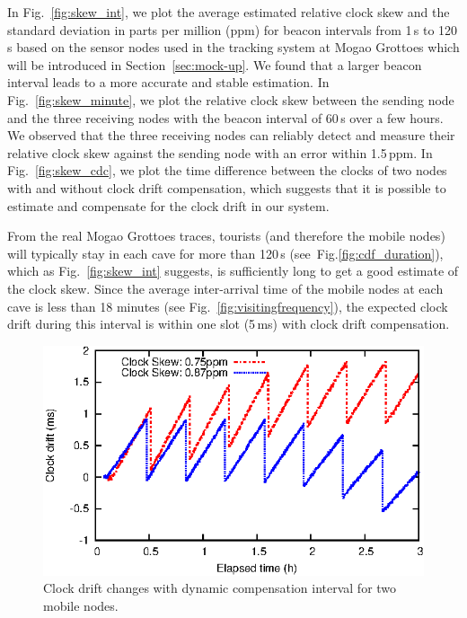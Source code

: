 \documentclass[twoside,twocolumn]{article}
\begin{document}
In Fig.~\ref{fig:skew_int}, we plot the average estimated relative
clock skew and the standard deviation in parts per million (ppm) for
beacon intervals from 1\,s to 120\,s based on the sensor nodes used
in the tracking system at Mogao Grottoes which will be introduced in 
Section~\ref{sec:mock-up}. We found that a larger beacon
interval leads to a more accurate and stable estimation.  In
Fig.~\ref{fig:skew_minute}, we plot the relative clock skew between
the sending node and the three receiving nodes with the beacon
interval of 60\,s over a few hours.  We observed that the three
receiving nodes can reliably detect and measure their relative clock
skew against the sending node with an error within 1.5\,ppm. In
Fig.~\ref{fig:skew_cdc}, we plot the time difference between the
clocks of two nodes with and without clock drift compensation, which
suggests that it is possible to estimate and compensate for the clock
drift in our system.

From the real Mogao Grottoes traces, tourists (and therefore the mobile
nodes) will typically stay in each cave for more than 120\,s
(see~Fig.\ref{fig:cdf_duration}), which as Fig.~\ref{fig:skew_int}
suggests, is sufficiently long to get a good estimate of the clock
skew. Since the average inter-arrival time of the mobile nodes at each
cave is less than 18 minutes (see Fig.~\ref{fig:visitingfrequency}),
the expected clock drift during this interval is within one slot
(5\,ms) with clock drift compensation.

\begin{figure}[t]
   \centering
   \includegraphics{graphs/clock-compensation-result/compensate-effect}
   \caption{Clock drift changes with dynamic compensation interval for two mobile nodes.}
   \label{fig:compensation}
\end{figure}
\end{document}

